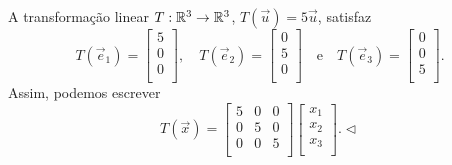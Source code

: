 \documentclass[../livro.tex]{subfiles}
\begin{document}
\begin{example}
A transformação linear $T: \mathbb{R}^3 \to \mathbb{R}^3$, $T(\vec{u}) = 5 \vec{u}$, satisfaz
\begin{equation}
T(\vec{e}_1) =
\left[
  \begin{array}{r}
    5 \\
    0 \\
    0 \\
  \end{array}
\right], \quad
T(\vec{e}_2) =
\left[
  \begin{array}{r}
     0 \\
     5 \\
     0 \\
  \end{array}
\right]  \quad \text{e} \quad
T(\vec{e}_3) =
\left[
  \begin{array}{r}
     0 \\
     0 \\
     5 \\
  \end{array}
\right].
\end{equation} Assim, podemos escrever
\begin{equation}
T(\vec{x}) = \left[
  \begin{array}{rrr}
    5  & 0 & 0 \\
    0  & 5 & 0 \\
    0  & 0 & 5 \\
  \end{array}
\right]
\left[
  \begin{array}{r}
    x_1 \\
    x_2 \\
    x_3 \\
  \end{array}
\right]. \lhd
\end{equation}
\end{example}
\end{document}
